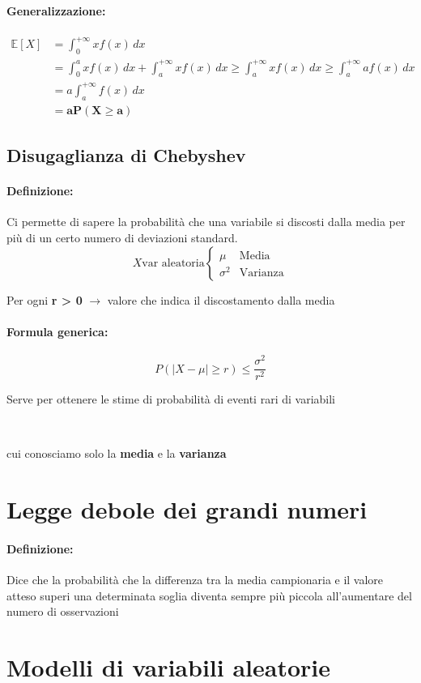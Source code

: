 \documentclass[]{article}
\newcommand{\ev}{\mathbb{E}[X]}
\renewcommand{\ev}[1]{\mathbb{E}[#1]}
\newcommand{\definizione}{\paragraph{Definizione:}}
\newcommand{\formula}{\paragraph{Formula generica:}}
\begin{document}
    \paragraph{Generalizzazione:}
    \begin{equation*}
        \begin{split}
            \ev{X} & = \int_{0}^{+\infty} xf(x) \, dx \\
            & = \int_{0}^{a} x f(x) \, dx + \int_{a}^{+\infty} x f(x) \, dx \geq \int_{a}^{+\infty} x f(x) \, dx \geq \int_{a}^{+\infty} a f(x) \, dx \\
            & = a \int_{a}^{+\infty} f(x) \, dx \\ 
            & = \boldsymbol{aP(X \geq a)}
        \end{split}
    \end{equation*}
    
    \subsection{Disugaglianza di Chebyshev}
    \definizione Ci permette di sapere la probabilità che una variabile si discosti dalla media per più di un certo numero di deviazioni standard.
    \begin{equation*}
        X \text{var aleatoria}
        \begin{cases}
            \mu & \text{Media} \\
            \sigma^2 & \text{Varianza}
        \end{cases}
    \end{equation*}

    \centerline{Per ogni \textbf{r > 0} $\longrightarrow$ valore che indica il discostamento dalla media}
    \formula 
    \[ P(|X - \mu| \geq r) \leq \frac{\sigma^2}{r^2} \]
    \centerline{Serve per ottenere le stime di probabilità di eventi rari di variabili} \\
    \centerline{cui conosciamo solo la \textbf{media} e la \textbf{varianza}}
    \section{Legge debole dei grandi numeri}
    \definizione Dice che la probabilità che la differenza tra la media campionaria e il valore atteso superi una determinata soglia diventa sempre più piccola all'aumentare del numero di osservazioni

    \newpage
    \section{Modelli di variabili aleatorie}
\end{document}
